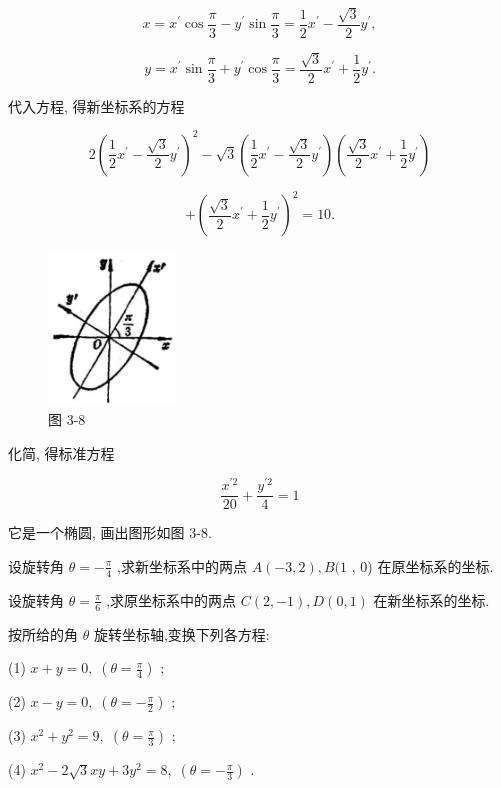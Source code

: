 \documentclass[lang=cn,newtx,10pt,scheme=chinese]{elegantbook}
\begin{document}
\[
  x = {x}^{\prime }\cos \frac{\pi }{3} - {y}^{\prime }\sin \frac{\pi }{3} = \frac{1}{2}{x}^{\prime } - \frac{\sqrt{3}}{2}{y}^{\prime },
\]

\[
  y = {x}^{\prime }\sin \frac{\pi }{3} + {y}^{\prime }\cos \frac{\pi }{3} = \frac{\sqrt{3}}{2}{x}^{\prime } + \frac{1}{2}{y}^{\prime }.
\]

代入方程, 得新坐标系的方程

\[
  2{\left( \frac{1}{2}{x}^{\prime } - \frac{\sqrt{3}}{2}{y}^{\prime }\right) }^{2} - \sqrt{3}\left( {\frac{1}{2}{x}^{\prime } - \frac{\sqrt{3}}{2}{y}^{\prime }}\right) \left( {\frac{\sqrt{3}}{2}{x}^{\prime } + \frac{1}{2}{y}^{\prime }}\right)
\]

\[
  + {\left( \frac{\sqrt{3}}{2}{x}^{\prime } + \frac{1}{2}{y}^{\prime }\right) }^{2} = {10}.
\]

\begin{figure}[h]
  \centering
  \includegraphics[max width=0.3\textwidth]{images/01912cc2-ffb6-728e-9ae7-b113ff05c64b_142_291960.jpg}
  \caption{图 3-8}
\end{figure}



化简, 得标准方程

\[
  \frac{{x}^{\prime 2}}{20} + \frac{{y}^{\prime 2}}{4} = 1
\]

它是一个椭圆, 画出图形如图 3-8.

\begin{problemset}[练习]

\item 设旋转角 \(\theta = - \frac{\pi }{4}\) ,求新坐标系中的两点 \(A\left( {-3,2}\right) ,B(1\) , 0) 在原坐标系的坐标.

\item 设旋转角 \(\theta = \frac{\pi }{6}\) ,求原坐标系中的两点 \(C\left( {2, - 1}\right) ,D\left( {0,1}\right)\) 在新坐标系的坐标.

\item 按所给的角 \(\theta\) 旋转坐标轴,变换下列各方程:

(1) \(x + y = 0,\;\left( {\theta = \frac{\pi }{4}}\right)\) ;

(2) \(x - y = 0,\;\left( {\theta = - \frac{\pi }{2}}\right)\) ;

(3) \({x}^{2} + {y}^{2} = 9,\;\left( {\theta = \frac{\pi }{3}}\right)\) ;

(4) \({x}^{2} - 2\sqrt{3}{xy} + 3{y}^{2} = 8,\;\left( {\theta = - \frac{\pi }{3}}\right)\) .

\end{problemset}
\end{document}
